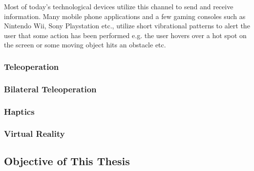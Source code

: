 Most of today's technological devices utilize this channel to send and receive information. Many mobile phone applications and a few gaming consoles such as Nintendo Wii\raisebox{0.5ex}{\scriptsize\texttrademark}, Sony Playstation\raisebox{0.5ex}{\scriptsize\texttrademark} etc., utilize short vibrational patterns to alert the user that some action has been performed e.g. the user hovers over a hot spot on the screen or some moving object hits an obstacle etc. 


\subsubsection{Teleoperation}

\pagebreak[1]

\subsubsection{Bilateral Teleoperation}

\pagebreak[1]
\subsubsection{Haptics}
\pagebreak[1]
\subsubsection{Virtual Reality}
\pagebreak[1]



\subsection{Objective of This Thesis}
\pagebreak[1]


